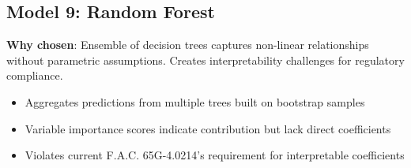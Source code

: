 
\subsection{Model 9: Random Forest}
\textbf{Why chosen}: Ensemble of decision trees captures non-linear relationships without parametric assumptions. Creates interpretability challenges for regulatory compliance.
\begin{itemize}
    \item Aggregates predictions from multiple trees built on bootstrap samples
    \item Variable importance scores indicate contribution but lack direct coefficients
    \item Violates current F.A.C. 65G-4.0214's requirement for interpretable coefficients
\end{itemize}


